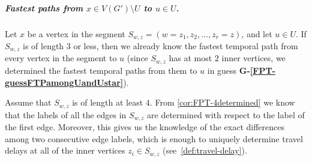 \documentclass[a4paper,UKenglish,cleveref, autoref, thm-restate]{lipics-v2021}
\begin{document}
\subparagraph{\boldmath Fastest paths from $x \in V(G') \setminus U$ to $u \in U$.}
Let $x$ be a vertex in the segment $S_{w,z} = (w=z_1,z_2, \dots, z_r = z)$, and let $u\in U$.
If $S_{w,z}$ is of length $3$ or less, then we already know the fastest temporal path from every vertex in the segment to $u$ 
(since $S_{w,z}$ has at most $2$ inner vertices, we determined the fastest temporal paths from them to $u$ in guess \textcolor{lipicsGray}{\textsf{\textbf{G-\ref{FPT-guessFTPamongUandUstar}}}}).

Assume that $S_{w,z}$ is of length at least $4$. From \cref{cor:FPT-4determined} we know that the labels of all the edges in $S_{w,z}$ are determined with respect to the label of the first edge.
Moreover, this gives us the knowledge of the exact differences among two consecutive edge labels, which is enough to uniquely determine travel delays at all of the inner vertices $z_i \in S_{w,z}$ (see~\cref{def:travel-delay}).
\end{document}
